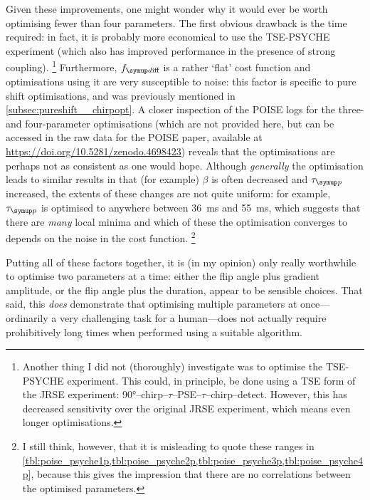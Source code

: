 Given these improvements, one might wonder why it would ever be worth optimising fewer than four parameters.
The first obvious drawback is the time required: in fact, it is probably more economical to use the TSE-PSYCHE experiment (which also has improved performance in the presence of strong coupling).%
\footnote{Another thing I did not (thoroughly) investigate was to optimise the TSE-PSYCHE experiment. This could, in principle, be done using a TSE form of the JRSE experiment: \ang{90}--chirp--$\tau$--PSE--$\tau$--chirp--detect. However, this has decreased sensitivity over the original JRSE experiment, which means even longer optimisations.}
Furthermore, $\fdiff$ is a rather `flat' cost function and optimisations using it are very susceptible to noise: this factor is specific to pure shift optimisations, and was previously mentioned in \cref{subsec:pureshift__chirpopt}.
A closer inspection of the POISE logs for the three- and four-parameter optimisations (which are not provided here, but can be accessed in the raw data for the POISE paper, available at \url{https://doi.org/10.5281/zenodo.4698423}) reveals that the optimisations are perhaps not as consistent as one would hope.
Although \textit{generally} the optimisation leads to similar results in that (for example) $\beta$ is often decreased and $\taup$ increased, the extents of these changes are not quite uniform: for example, $\taup$ is optimised to anywhere between \qty{36}{\ms} and \qty{55}{\ms}, which suggests that there are \textit{many} local minima and which of these the optimisation converges to depends on the noise in the cost function.%
\footnote{I still think, however, that it is misleading to quote these ranges in \cref{tbl:poise_psyche1p,tbl:poise_psyche2p,tbl:poise_psyche3p,tbl:poise_psyche4p}, because this gives the impression that there are no correlations between the optimised parameters.}

Putting all of these factors together, it is (in my opinion) only really worthwhile to optimise two parameters at a time: either the flip angle plus gradient amplitude, or the flip angle plus the duration, appear to be sensible choices.
That said, this \textit{does} demonstrate that optimising multiple parameters at once---ordinarily a very challenging task for a human---does not actually require prohibitively long times when performed using a suitable algorithm.
